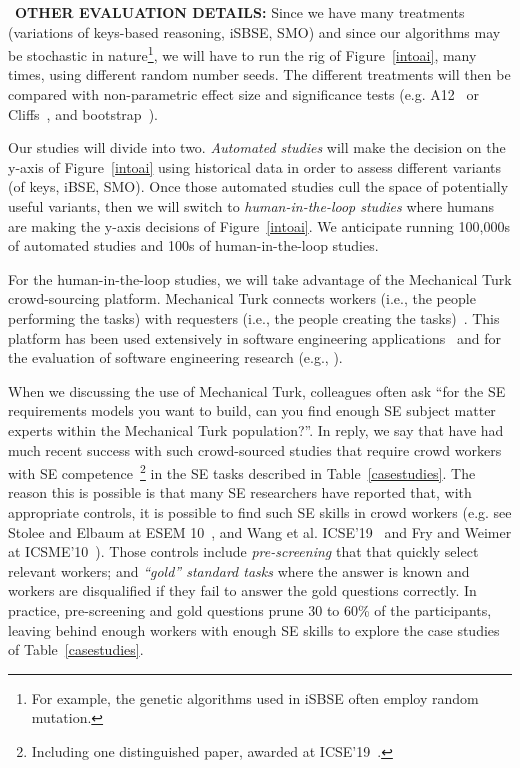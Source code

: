                 
~{\bf OTHER EVALUATION DETAILS:}
Since we have many treatments (variations of keys-based reasoning, iSBSE, SMO)
and since   our algorithms may be  stochastic in nature\footnote{For
example, the genetic algorithms used in iSBSE often employ random mutation.}, we will have to run the rig of Figure~\ref{intoai}, many times, using different random
number seeds. The different treatments will then be compared
with non-parametric effect size and significance tests
(e.g. A12~\cite{Arcuri} or Cliffs~\cite{hess2004robust}, and bootstrap~\cite{EfroTibs93}).

Our studies will divide into two. {\em Automated studies} will make the decision on the y-axis
of  Figure~\ref{intoai} using historical data in order to assess different variants
(of keys, iBSE, SMO).
Once those automated studies cull  the space of potentially useful variants, then we will switch to {\em human-in-the-loop
studies} where humans are making the y-axis decisions of Figure~\ref{intoai}.
We anticipate running 100,000s of automated studies and 100s
of human-in-the-loop studies.

 For the human-in-the-loop studies, we will take advantage
of the Mechanical Turk crowd-sourcing platform.
   Mechanical Turk   connects workers (i.e., the people performing the tasks) with requesters (i.e., the people creating the tasks)~\cite{mturk}.  This platform has been used extensively in software engineering applications~\cite{mao15} and for the evaluation of software engineering research (e.g., \cite{Stolee:2010:EUC:1852786.1852832,stoleeesem2013,Fry:2010:HSF:1912607.1913292}). 
   
When we discussing the use of Mechanical Turk,
colleagues often ask ``for the SE
requirements models you want to build, can you find enough SE subject matter experts
within the Mechanical Turk population?''. In reply, we say that have had much recent success with such crowd-sourced studies that require crowd workers with SE competence~\cite{wangicse19,8813275,wang2020isense2}\footnote{Including
one distinguished paper, awarded at ICSE'19~\cite{wangicse19}.}
in the SE tasks described in Table~\ref{casestudies}.
The reason this is possible is that many SE researchers have reported that, with appropriate
controls, it is possible to find such
SE skills in crowd workers
(e.g. see Stolee and Elbaum at  ESEM
10~\cite{Stolee:2010:EUC:1852786.1852832}, and
Wang et al.  ICSE'19~\cite{wangicse19}
and Fry and Weimer at 
ICSME'10~\cite{Fry:2010:HSF:1912607.1913292}).
Those controls include 
{\em pre-screening} that that   quickly select
relevant workers; and {\em ``gold'' standard tasks}
where the answer is known and workers are disqualified if
they fail to answer the gold questions correctly. In practice,
pre-screening and gold questions prune 30 to 60\% of the participants,
leaving behind enough workers
with enough SE skills to explore the case studies
of Table~\ref{casestudies}.

